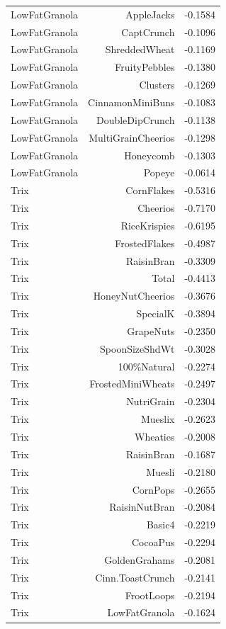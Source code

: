 \begin{longtable}{@{}lrr@{}}
LowFatGranola & AppleJacks & -0.1584 \\
LowFatGranola & CaptCrunch & -0.1096 \\
LowFatGranola & ShreddedWheat & -0.1169 \\
LowFatGranola & FruityPebbles & -0.1380 \\
LowFatGranola & Clusters & -0.1269 \\
LowFatGranola & CinnamonMiniBuns & -0.1083 \\
LowFatGranola & DoubleDipCrunch & -0.1138 \\
LowFatGranola & MultiGrainCheerios & -0.1298 \\
LowFatGranola & Honeycomb & -0.1303 \\
LowFatGranola & Popeye & -0.0614 \\
Trix & CornFlakes & -0.5316 \\
Trix & Cheerios & -0.7170 \\
Trix & RiceKrispies & -0.6195 \\
Trix & FrostedFlakes & -0.4987 \\
Trix & RaisinBran & -0.3309 \\
Trix & Total & -0.4413 \\
Trix & HoneyNutCheerios & -0.3676 \\
Trix & SpecialK & -0.3894 \\
Trix & GrapeNuts & -0.2350 \\
Trix & SpoonSizeShdWt & -0.3028 \\
Trix & 100\%Natural & -0.2274 \\
Trix & FrostedMiniWheats & -0.2497 \\
Trix & NutriGrain & -0.2304 \\
Trix & Mueslix & -0.2623 \\
Trix & Wheaties & -0.2008 \\
Trix & RaisinBran & -0.1687 \\
Trix & Muesli & -0.2180 \\
Trix & CornPops & -0.2655 \\
Trix & RaisinNutBran & -0.2084 \\
Trix & Basic4 & -0.2219 \\
Trix & CocoaPus & -0.2294 \\
Trix & GoldenGrahams & -0.2081 \\
Trix & Cinn.ToastCrunch & -0.2141 \\
Trix & FrootLoops & -0.2194 \\
Trix & LowFatGranola & -0.1624 \\

\end{longtable}

